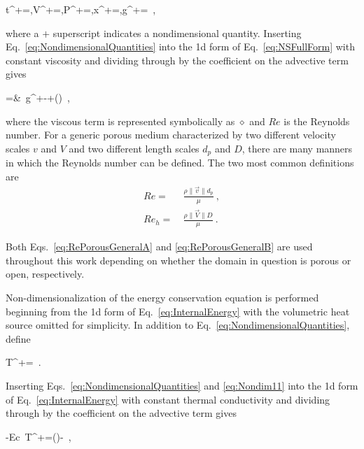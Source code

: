 \beq
\label{eq:NondimensionalQuantities}
t^+=,\quad V^+=,\quad P^+=,\quad x^+=,\quad g^+=\ ,
\eeq

\noindent where a \(+\) superscript indicates a nondimensional quantity. Inserting Eq.\ \eqref{eq:NondimensionalQuantities} into the \gls{1d} form of Eq.\ \eqref{eq:NSFullForm} with constant viscosity and dividing through by the coefficient on the advective term gives

\beqa
\label{eq:NondimensionalNS2}
=&\ g^+-+\left(\diamond\right)\ ,
\eeqa

\noindent where the viscous term is represented symbolically as \(\diamond\) and \(Re\) is the Reynolds number. For a generic porous medium characterized by two different velocity scales \(v\) and \(V\) and two different length scales \(d_p\) and \(D\), there are many manners in which the Reynolds number can be defined. The two most common definitions are
\begin{subequations}
\label{eq:RePorousGeneral}
\begin{align}
\label{eq:RePorousGeneralA}
Re=&\ \frac{\rho \|\vec{v}\|d_p}{\mu}\ ,\\
\label{eq:RePorousGeneralB}
Re_h=&\ \frac{\rho \|\vec{V}\|D}{\mu}\ .
\end{align}
\end{subequations}

\noindent Both Eqs.\ \eqref{eq:RePorousGeneralA} and \eqref{eq:RePorousGeneralB} are used throughout this work depending on whether the domain in question is porous or open, respectively. 

Non-dimensionalization of the energy conservation equation is performed beginning from the \gls{1d} form of Eq.\ \eqref{eq:InternalEnergy} with the volumetric heat source omitted for simplicity. In addition to Eq.\ \eqref{eq:NondimensionalQuantities}, define

\beq
\label{eq:Nondim11}
T^+=\ .
\eeq

\noindent Inserting Eqs.\ \eqref{eq:NondimensionalQuantities} and \eqref{eq:Nondim11} into the \gls{1d} form of Eq.\ \eqref{eq:InternalEnergy} with constant thermal conductivity and dividing through by the coefficient on the advective term gives

\beq
\label{eq:NondimensionalTemperatureEqn}
-\beta Ec\ T^+=(\diamond)-\ ,
\eeq

